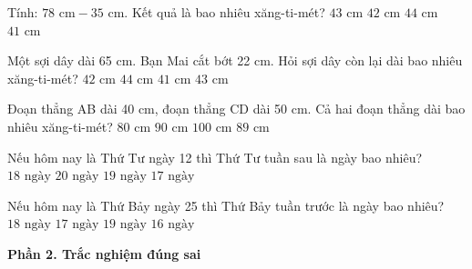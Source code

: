 \begin{ex} %
Tính: $78\text{ cm} - 35\text{ cm}$. Kết quả là bao nhiêu xăng-ti-mét?
\choice
{\True $43\text{ cm}$}
{$42\text{ cm}$}
{$44\text{ cm}$}
{$41\text{ cm}$}
\end{ex}

\begin{ex} %
Một sợi dây dài 65 cm. Bạn Mai cắt bớt 22 cm. Hỏi sợi dây còn lại dài bao nhiêu xăng-ti-mét?
\choice
{$42\text{ cm}$}
{$44\text{ cm}$}
{$41\text{ cm}$}
{\True $43\text{ cm}$}
\end{ex}

\begin{ex} %
Đoạn thẳng AB dài 40 cm, đoạn thẳng CD dài 50 cm. Cả hai đoạn thẳng dài bao nhiêu xăng-ti-mét?
\choice
{$80\text{ cm}$}
{\True $90\text{ cm}$}
{$100\text{ cm}$}
{$89\text{ cm}$}
\end{ex}

\begin{ex} %
Nếu hôm nay là Thứ Tư ngày 12 thì Thứ Tư tuần sau là ngày bao nhiêu?
\choice
{$18\text{ ngày}$}
{$20\text{ ngày}$}
{\True $19\text{ ngày}$}
{$17\text{ ngày}$}
\end{ex}

\begin{ex} %
Nếu hôm nay là Thứ Bảy ngày 25 thì Thứ Bảy tuần trước là ngày bao nhiêu?
\choice
{\True $18\text{ ngày}$}
{$17\text{ ngày}$}
{$19\text{ ngày}$}
{$16\text{ ngày}$}
\end{ex}

\textbf{Phần 2. Trắc nghiệm đúng sai}

